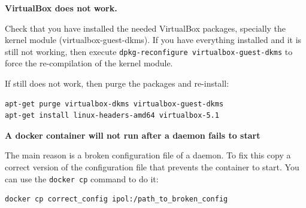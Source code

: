 \documentclass[a4paper,12pt]{article}
\begin{document}
\textbf{VirtualBox does not work.}

Check that you have installed the needed VirtualBox packages, specially the kernel module (virtualbox-guest-dkms).
If you have everything installed and it is still not working, then execute {\tt dpkg-reconfigure virtualbox-guest-dkms} to force the re-compilation of the kernel module.

If still does not work, then purge the packages and re-install:

\begin{verbatim}
apt-get purge virtualbox-dkms virtualbox-guest-dkms
apt-get install linux-headers-amd64 virtualbox-5.1
\end{verbatim}

\textbf{A docker container will not run after a daemon fails to start}

The main reason is a broken configuration file of a daemon. To fix this copy a correct version of the configuration file that prevents the container to start. You can use the {\tt docker cp} command to do it:

\begin{verbatim}
docker cp correct_config ipol:/path_to_broken_config
\end{verbatim}



\end{document}
